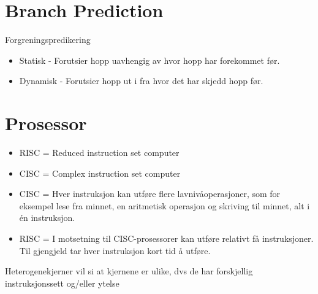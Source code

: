 \documentclass[a4paper, 10pt]{article}
\begin{document}
\section{Branch Prediction}
Forgreningspredikering

\begin{itemize}
	\item Statisk - Forutsier hopp uavhengig av hvor hopp har forekommet før.
	\item Dynamisk - Forutsier hopp ut i fra hvor det har skjedd hopp før.
\end{itemize}

\section{Prosessor}

\begin{itemize}
\item RISC = Reduced instruction set computer 
\item CISC = Complex instruction set computer
\item CISC = Hver instruksjon kan utføre flere lavnivåoperasjoner, som for eksempel lese fra minnet, en aritmetisk operasjon og skriving til minnet, alt i én instruksjon.
\item RISC = I motsetning til CISC-prosessorer kan utføre relativt få instruksjoner. Til gjengjeld tar hver instruksjon kort tid å utføre.
\end{itemize}

Heterogenekjerner vil si at kjernene er ulike, dvs de har forskjellig instruksjonssett og/eller ytelse
\end{document}
